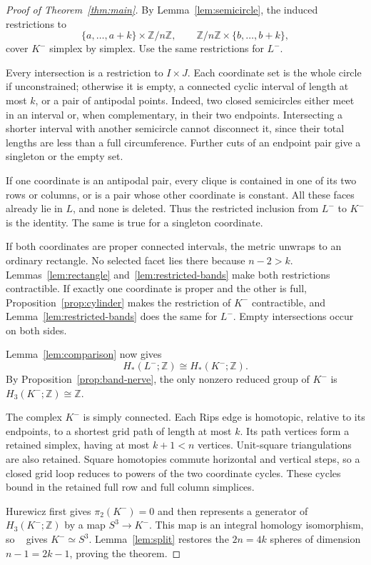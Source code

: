 \documentclass[11pt]{amsart}
\newcommand{\ZZ}{\mathbb Z}
\begin{document}
\begin{proof}[Proof of Theorem~\ref{thm:main}]
By Lemma~\ref{lem:semicircle}, the induced restrictions to
\[
\{a,\ldots,a+k\}\times\ZZ/n\ZZ,\qquad
\ZZ/n\ZZ\times\{b,\ldots,b+k\},
\]
cover \(K^-\) simplex by simplex. Use the same restrictions for \(L^-\).

Every intersection is a restriction to \(I\times J\). Each coordinate
set is the whole circle if unconstrained; otherwise it is empty,
a connected cyclic interval of length at most \(k\), or a pair of
antipodal points. Indeed, two closed semicircles either meet in an
interval or, when complementary, in their two endpoints. Intersecting
a shorter interval with another semicircle cannot disconnect it, since
their total lengths are less than a full circumference. Further cuts of
an endpoint pair give a singleton or the empty set.

If one coordinate is an antipodal pair, every clique is contained in
one of its two rows or columns, or is a pair whose other coordinate is
constant. All these faces already lie in \(L\), and none is deleted.
Thus the restricted inclusion from \(L^-\) to \(K^-\) is the identity.
The same is true for a singleton coordinate.

If both coordinates are proper connected intervals, the metric unwraps
to an ordinary rectangle. No selected facet lies there because
\(n-2>k\). Lemmas~\ref{lem:rectangle} and~\ref{lem:restricted-bands}
make both restrictions contractible.
If exactly one coordinate is proper and the other is full,
Proposition~\ref{prop:cylinder} makes the restriction of \(K^-\)
contractible, and Lemma~\ref{lem:restricted-bands} does the same for
\(L^-\). Empty intersections occur on both sides.

Lemma~\ref{lem:comparison} now gives
\[
H_*(L^-;\ZZ)\cong H_*(K^-;\ZZ).
\]
By Proposition~\ref{prop:band-nerve}, the only nonzero reduced group of
\(K^-\) is \(H_3(K^-;\ZZ)\cong\ZZ\).

The complex \(K^-\) is simply connected. Each Rips edge is homotopic,
relative to its endpoints, to a shortest grid path of length at most
\(k\). Its path vertices form a retained simplex, having at most
\(k+1<n\) vertices. Unit-square triangulations are also retained.
Square homotopies commute horizontal and vertical steps, so a closed grid
loop reduces to powers of the two coordinate cycles. These cycles bound
in the retained full row and full column simplices.

Hurewicz first gives \(\pi_2(K^-)=0\) and then represents a generator of
\(H_3(K^-;\ZZ)\) by a map \(S^3\to K^-\).
This map is an integral homology isomorphism, so
~\cite[Theorem~4.32 and Corollary~4.33]{hatcher} gives \(K^-\simeq S^3\).
Lemma~\ref{lem:split} restores the \(2n=4k\) spheres of dimension
\(n-1=2k-1\), proving the theorem.
\end{proof}
\end{document}

